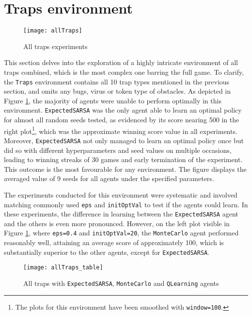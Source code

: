 \section{Traps environment}
\begin{figure}[h]
    \centering
    \texttt{[image: allTraps]}
    \caption{All traps experiments}
    \label{fig:alltraps_eg}
\end{figure}

This section delves into the exploration of a highly intricate environment of all traps combined, which is the most complex one barring the full game. To clarify, the \texttt{Traps} environment contains all 10 trap types mentioned in the previous section, and omits any bugs, virus or token type of obstacles. As depicted in Figure \ref{fig:alltraps_eg}, the majority of agents were unable to perform optimally in this environment. \texttt{ExpectedSARSA} was the only agent able to learn an optimal policy for almost all random seeds tested, as evidenced by its score nearing 500 in the right plot\footnote{The plots for this environment have been smoothed with \texttt{window=100}.}, which was the approximate winning score value in all experiments. Moreover, \texttt{ExpectedSARSA} not only managed to learn an optimal policy once but did so with different hyperparameters and seed values on multiple occasions, leading to winning streaks of 30 games and early termination of the experiment. This outcome is the most favourable for any environment. The figure displays the averaged value of 9 seeds for all agents under the specified parameters. 

The experiments conducted for this environment were systematic and involved matching commonly used \texttt{eps} and \texttt{initOptVal} to test if the agents could learn. In these experiments, the difference in learning between the \texttt{ExpectedSARSA} agent and the others is even more pronounced. However, on the left plot visible in Figure \ref{fig:alltraps_eg}, where \texttt{eps=0.4} and \texttt{initOptVal=20}, the \texttt{MonteCarlo} agent performed reasonably well, attaining an average score of approximately 100, which is substantially superior to the other agents, except for \texttt{ExpectedSARSA}.

\begin{figure}[h]
    \centering
    \texttt{[image: allTraps\_table]}
    \caption{All traps with \texttt{ExpectedSARSA}, \texttt{MonteCarlo} and \texttt{QLearning} agents}
    \label{fig:traps_table_eg}
\end{figure}

